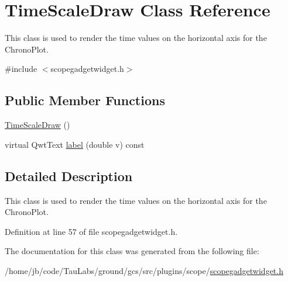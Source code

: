 \hypertarget{class_time_scale_draw}{\section{\-Time\-Scale\-Draw \-Class \-Reference}
\label{class_time_scale_draw}
}


\-This class is used to render the time values on the horizontal axis for the \-Chrono\-Plot.  




{\ttfamily \#include $<$scopegadgetwidget.\-h$>$}

\subsection*{\-Public \-Member \-Functions}
\begin{DoxyCompactItemize}
\item 
\hyperlink{group___scope_plugin_ga84399225e78ebb91c66163a637662f2a}{\-Time\-Scale\-Draw} ()
\item 
virtual \-Qwt\-Text \hyperlink{group___scope_plugin_gadd46f1edfb468453018c231b7a1e92f2}{label} (double v) const 
\end{DoxyCompactItemize}


\subsection{\-Detailed \-Description}
\-This class is used to render the time values on the horizontal axis for the \-Chrono\-Plot. 

\-Definition at line 57 of file scopegadgetwidget.\-h.



\-The documentation for this class was generated from the following file\-:\begin{DoxyCompactItemize}
\item 
/home/jb/code/\-Tau\-Labs/ground/gcs/src/plugins/scope/\hyperlink{scopegadgetwidget_8h}{scopegadgetwidget.\-h}\end{DoxyCompactItemize}
